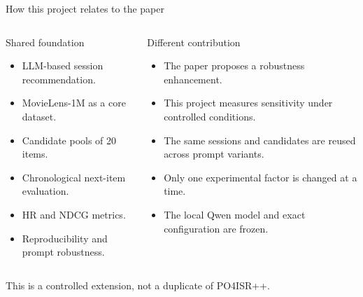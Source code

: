 \documentclass[aspectratio=169,12pt]{beamer}
\begin{document}
\begin{frame}{How this project relates to the paper}
\small
\begin{columns}[T]
\begin{exampleblock}{Shared foundation}
\begin{itemize}
  \item LLM-based session recommendation.
  \item MovieLens-1M as a core dataset.
  \item Candidate pools of 20 items.
  \item Chronological next-item evaluation.
  \item HR and NDCG metrics.
  \item Reproducibility and prompt robustness.
\end{itemize}
\end{exampleblock}

\begin{block}{Different contribution}
\begin{itemize}
  \item The paper proposes a robustness enhancement.
  \item This project measures sensitivity under controlled conditions.
  \item The same sessions and candidates are reused across prompt variants.
  \item Only one experimental factor is changed at a time.
  \item The local Qwen model and exact configuration are frozen.
\end{itemize}
\end{block}
\end{columns}

\vspace{0.5em}
\centering
\textcolor{DeepBlue}{This is a controlled extension, not a duplicate of PO4ISR++.}
\end{frame}
\end{document}
